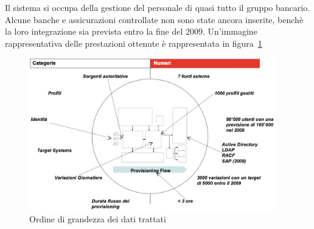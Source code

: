 Il sistema si occupa della gestione del personale di quasi tutto il gruppo
bancario. Alcune banche e assicurazioni controllate non sono state ancora
inserite, benchè la loro integrazione sia prevista entro la fine del 2009.
Un'immagine rappresentativa delle prestazioni ottenute è rappresentata in
figura~\ref{descrizioneprogetto}


\begin{figure}
\centering
\includegraphics[width=0.95\textwidth]{img/descrizioneprogetto.eps}
\caption{Ordine di grandezza dei dati trattati}
\label{descrizioneprogetto}
\end{figure}

